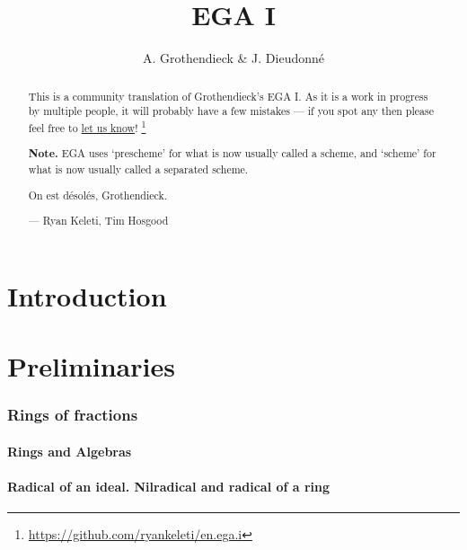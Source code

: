 \documentclass[10pt,oneside]{amsart}
\title{EGA I}
\author{A. Grothendieck \& J. Dieudonn{\'e}}
\begin{document}
\renewcommand{\abstractname}{What this is}
\begin{abstract}
    This is a community translation of Grothendieck's EGA I.
    As it is a work in progress by multiple people, it will probably have a few
    mistakes --- if you spot any then please feel free to
    \href{https://github.com/ryankeleti/en.ega.i/issues}{let us know}!
    \thanks{\url{https://github.com/ryankeleti/en.ega.i}}

\noindent
    \textbf{Note.} EGA uses `prescheme' for what is now usually called
    a scheme, and `scheme' for what is now usually called a
    separated scheme.
 
    On est d{\'e}sol{\'e}s, Grothendieck.

    --- Ryan Keleti, Tim Hosgood
\end{abstract}

\maketitle

\noindent\hspace{0.15\linewidth}

{
  \tableofcontents{}
}

\clearpage

\part*{Introduction}


\clearpage

\setcounter{part}{-1}

\part{Preliminaries}

    \section{Rings of fractions}
    \setcounter{subsection}{-1}

        \subsection{Rings and Algebras}
        

        \subsection{Radical of an ideal. Nilradical and radical of a ring}
        
\end{document}
